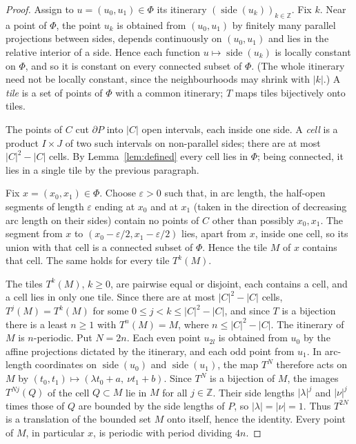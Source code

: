 \documentclass[11pt]{amsart}
\theoremstyle{definition}
\theoremstyle{remark}
\newcommand{\Z}{\mathbb Z}
\newcommand{\side}{\operatorname{side}}
\begin{document}
\begin{proof}
Assign to $u=(u_0,u_1)\in\Phi$ its itinerary $(\side(u_k))_{k\in\Z}$. Fix $k$. Near a point of $\Phi$, the point $u_k$ is obtained from $(u_0,u_1)$ by finitely many parallel projections between sides, depends continuously on $(u_0,u_1)$ and lies in the relative interior of a side. Hence each function $u\mapsto\side(u_k)$ is locally constant on $\Phi$, and so it is constant on every connected subset of $\Phi$. (The whole itinerary need not be locally constant, since the neighbourhoods may shrink with $|k|$.) A \emph{tile} is a set of points of $\Phi$ with a common itinerary; $T$ maps tiles bijectively onto tiles.

The points of $C$ cut $\partial P$ into $|C|$ open intervals, each inside one side. A \emph{cell} is a product $I\times J$ of two such intervals on non-parallel sides; there are at most $|C|^2-|C|$ cells. By Lemma~\ref{lem:defined} every cell lies in $\Phi$; being connected, it lies in a single tile by the previous paragraph.

Fix $x=(x_0,x_1)\in\Phi$. Choose $\varepsilon>0$ such that, in arc length, the half-open segments of length $\varepsilon$ ending at $x_0$ and at $x_1$ (taken in the direction of decreasing arc length on their sides) contain no points of $C$ other than possibly $x_0,x_1$. The segment from $x$ to $(x_0-\varepsilon/2,x_1-\varepsilon/2)$ lies, apart from $x$, inside one cell, so its union with that cell is a connected subset of $\Phi$. Hence the tile $M$ of $x$ contains that cell. The same holds for every tile $T^k(M)$.

The tiles $T^k(M)$, $k\ge0$, are pairwise equal or disjoint, each contains a cell, and a cell lies in only one tile. Since there are at most $|C|^2-|C|$ cells, $T^j(M)=T^k(M)$ for some $0\le j<k\le|C|^2-|C|$, and since $T$ is a bijection there is a least $n\ge1$ with $T^n(M)=M$, where $n\le|C|^2-|C|$. The itinerary of $M$ is $n$-periodic. Put $N=2n$. Each even point $u_{2l}$ is obtained from $u_0$ by the affine projections dictated by the itinerary, and each odd point from $u_1$. In arc-length coordinates on $\side(u_0)$ and $\side(u_1)$, the map $T^N$ therefore acts on $M$ by $(t_0,t_1)\mapsto(\lambda t_0+a,\ \nu t_1+b)$. Since $T^N$ is a bijection of $M$, the images $T^{Nj}(Q)$ of the cell $Q\subset M$ lie in $M$ for all $j\in\Z$. Their side lengths $|\lambda|^j$ and $|\nu|^j$ times those of $Q$ are bounded by the side lengths of $P$, so $|\lambda|=|\nu|=1$. Thus $T^{2N}$ is a translation of the bounded set $M$ onto itself, hence the identity. Every point of $M$, in particular $x$, is periodic with period dividing $4n$.
\end{proof}
\end{document}
